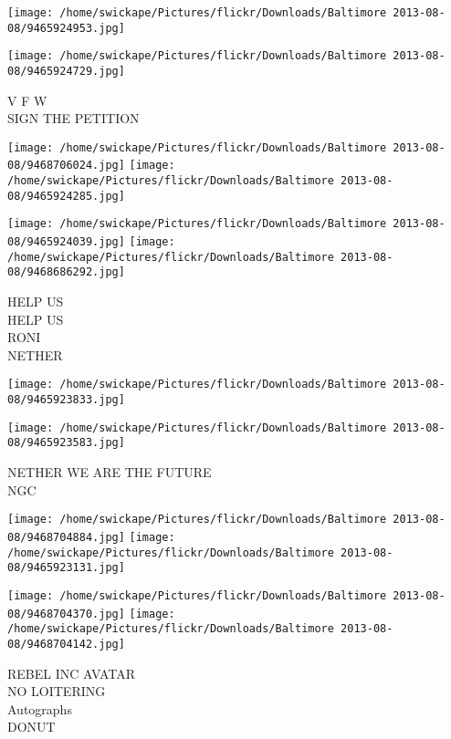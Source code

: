 \documentclass[10pt,letterpaper]{article}
\begin{document}
\texttt{[image: /home/swickape/Pictures/flickr/Downloads/Baltimore 2013-08-08/9465924953.jpg]}

\vspace{0.25in}
\texttt{[image: /home/swickape/Pictures/flickr/Downloads/Baltimore 2013-08-08/9465924729.jpg]}

V F W\\
SIGN THE PETITION\\
\pagebreak

\texttt{[image: /home/swickape/Pictures/flickr/Downloads/Baltimore 2013-08-08/9468706024.jpg]}
\texttt{[image: /home/swickape/Pictures/flickr/Downloads/Baltimore 2013-08-08/9465924285.jpg]}

\texttt{[image: /home/swickape/Pictures/flickr/Downloads/Baltimore 2013-08-08/9465924039.jpg]}
\texttt{[image: /home/swickape/Pictures/flickr/Downloads/Baltimore 2013-08-08/9468686292.jpg]}

HELP US\\
HELP US\\
RONI\\
NETHER\\
\pagebreak

\texttt{[image: /home/swickape/Pictures/flickr/Downloads/Baltimore 2013-08-08/9465923833.jpg]}

\vspace{0.25in}
\texttt{[image: /home/swickape/Pictures/flickr/Downloads/Baltimore 2013-08-08/9465923583.jpg]}

NETHER WE ARE THE FUTURE\\
NGC\\
\pagebreak

\texttt{[image: /home/swickape/Pictures/flickr/Downloads/Baltimore 2013-08-08/9468704884.jpg]}
\texttt{[image: /home/swickape/Pictures/flickr/Downloads/Baltimore 2013-08-08/9465923131.jpg]}

\texttt{[image: /home/swickape/Pictures/flickr/Downloads/Baltimore 2013-08-08/9468704370.jpg]}
\texttt{[image: /home/swickape/Pictures/flickr/Downloads/Baltimore 2013-08-08/9468704142.jpg]}

REBEL INC AVATAR\\
NO LOITERING\\
Autographs\\
DONUT\\
\pagebreak
\end{document}
